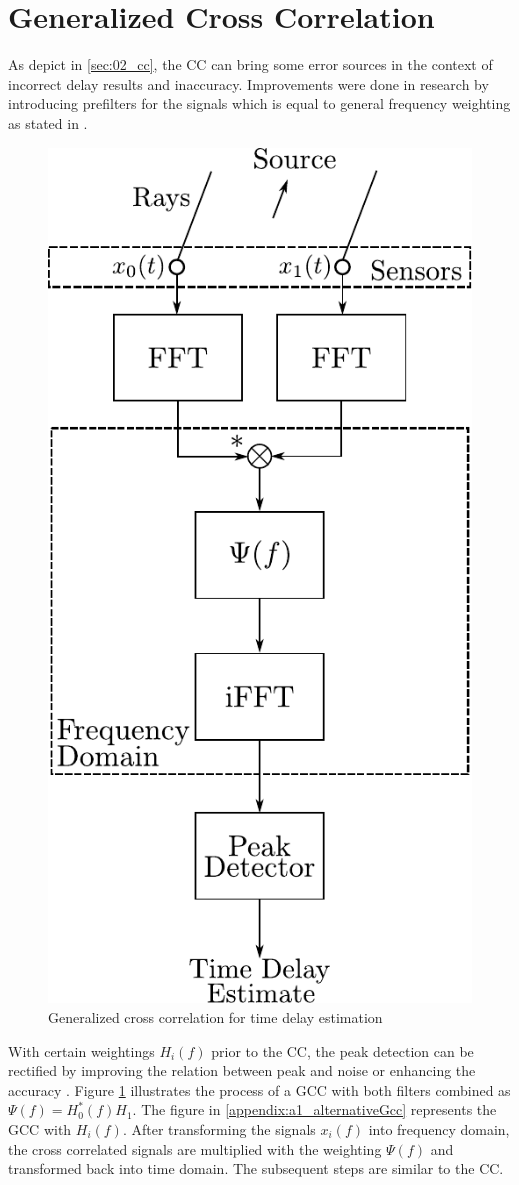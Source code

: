 \section{Generalized Cross Correlation}
\label{sec:02_gcc}

As depict in \cref{sec:02_cc}, the \ac{CC} can bring some error sources in the context of
incorrect delay results and inaccuracy.
Improvements were done in research by introducing prefilters for the signals
which is equal to general frequency weighting as stated in \cite{K_C_GCC}.
\begin{figure}[ht]
	\centering
		\includegraphics[width=0.35\columnwidth]{figures/GCC_weight}
	\caption{Generalized cross correlation for time delay estimation}
    \label{fig:02_GCC}
\end{figure}
With certain weightings $H_i(f)$ prior to the \ac{CC}, the peak detection
can be rectified by improving the relation between peak and noise or
enhancing the accuracy \cite{H_B_GCC}.
Figure \cref{fig:02_GCC} illustrates the process of a \ac{GCC} with both filters combined as
$\Psi(f) = H_0^*(f)H_1$. The figure in \cref{appendix:a1_alternativeGcc} represents the
\ac{GCC} with $H_i(f)$.
After transforming the signals $x_i(f)$ into frequency domain, the cross correlated
signals are multiplied with the weighting $\Psi(f)$ and transformed back into time domain.
The subsequent steps are similar to the \ac{CC}.


